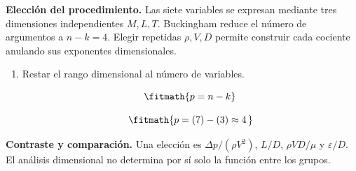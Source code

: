 \noindent\textbf{Elección del procedimiento.} Las siete variables se expresan mediante tres dimensiones independientes $M,L,T$. Buckingham reduce el número de argumentos a $n-k=4$. Elegir repetidas $\rho,V,D$ permite construir cada cociente anulando sus exponentes dimensionales.

\begin{enumerate}

\item Restar el rango dimensional al número de variables.

\[\fitmath{p=n-k}\]

\[\fitmath{p=(7)-(3)\approx 4\,}\]

\end{enumerate}

\noindent\textbf{Contraste y comparación.} Una elección es $\Delta p/(\rho V^2)$, $L/D$, $\rho VD/\mu$ y $\varepsilon/D$. El análisis dimensional no determina por sí solo la función entre los grupos.
